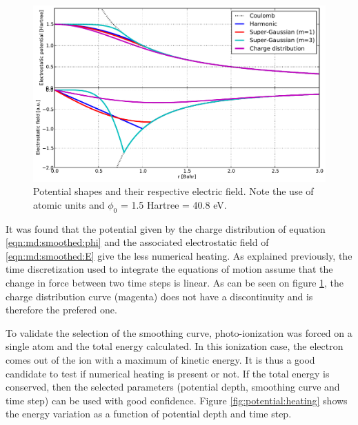 \begin{figure}
    \begin{center}
\includegraphics[width=0.98\columnwidth]{figures/potential_shapes}
    \end{center}
    \caption{\label{fig:potential:shapes}Potential shapes and their respective
    electric field. Note the use of atomic units and $\phi_0$ = 1.5 Hartree =
    40.8 eV.}
\end{figure}

It was found that the potential given by the charge distribution of equation
\eqref{eqn:md:smoothed:phi} and the associated electrostatic field of
\eqref{eqn:md:smoothed:E} give the less numerical heating. As explained
previously, the time discretization used to integrate the equations of motion
assume that the change in force between two time steps is linear. As can be
seen on figure \ref{fig:potential:shapes}, the charge distribution curve
(magenta) does not have a discontinuity and is therefore the prefered one.

To validate the selection of the smoothing curve, photo-ionization was forced
on a single atom and the total energy calculated. In this ionization case, the
electron comes out of the ion with a maximum of kinetic energy. It is thus a
good candidate to test if numerical heating is present or not. If the total
energy is conserved, then the selected parameters (potential depth, smoothing
curve and time step) can be used with good confidence. Figure
\ref{fig:potential:heating} shows the energy variation as a function
of potential depth and time step.




